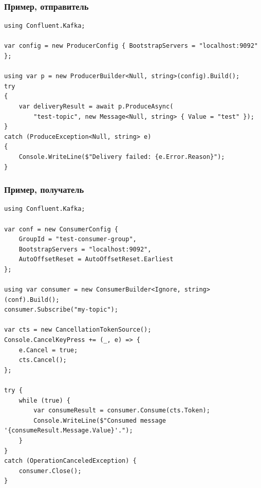 \documentclass{../../slides-style}
\begin{document}
    \begin{frame}[fragile]
        \frametitle{Пример, отправитель}
        \begin{small}
            \begin{verbatim}
using Confluent.Kafka;

var config = new ProducerConfig { BootstrapServers = "localhost:9092" };

using var p = new ProducerBuilder<Null, string>(config).Build();
try
{
    var deliveryResult = await p.ProduceAsync(
        "test-topic", new Message<Null, string> { Value = "test" });
}
catch (ProduceException<Null, string> e)
{
    Console.WriteLine($"Delivery failed: {e.Error.Reason}");
}
            \end{verbatim}
        \end{small}
    \end{frame}

    \begin{frame}[fragile]
        \frametitle{Пример, получатель}
        \begin{ssmall}
            \begin{verbatim}
using Confluent.Kafka;

var conf = new ConsumerConfig {
    GroupId = "test-consumer-group",
    BootstrapServers = "localhost:9092",
    AutoOffsetReset = AutoOffsetReset.Earliest
};

using var consumer = new ConsumerBuilder<Ignore, string>(conf).Build();
consumer.Subscribe("my-topic");

var cts = new CancellationTokenSource();
Console.CancelKeyPress += (_, e) => {
    e.Cancel = true;
    cts.Cancel();
};

try {
    while (true) {
        var consumeResult = consumer.Consume(cts.Token);
        Console.WriteLine($"Consumed message '{consumeResult.Message.Value}'.");
    }
}
catch (OperationCanceledException) {
    consumer.Close();
}
            \end{verbatim}
        \end{ssmall}
    \end{frame}
\end{document}
